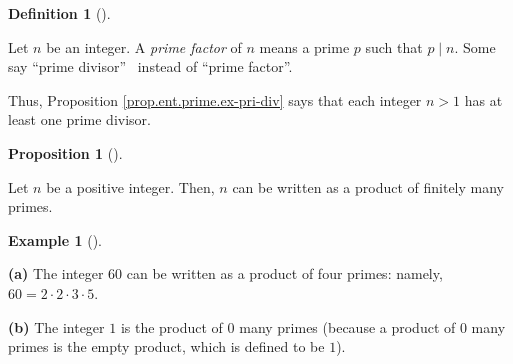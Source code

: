 \documentclass[numbers=enddot,12pt,final,onecolumn,notitlepage]{scrartcl}%
\numberwithin{exer}{subsection}
\theoremstyle{definition}
\newtheorem{prop}[theo]{Proposition}
\newenvironment{proposition}[1][]
{\begin{prop}[#1]\begin{leftbar}}
{\end{leftbar}\end{prop}}
\newtheorem{defi}[theo]{Definition}
\newenvironment{definition}[1][]
{\begin{defi}[#1]\begin{leftbar}}
{\end{leftbar}\end{defi}}
\newtheorem{exam}[theo]{Example}
\newenvironment{example}[1][]
{\begin{exam}[#1]\begin{leftbar}}
{\end{leftbar}\end{exam}}
\begin{document}
\begin{definition}
Let $n$ be an integer. A \textit{prime factor} of $n$ means a prime $p$ such
that $p\mid n$. Some say \textquotedblleft prime divisor\textquotedblright%
\ instead of \textquotedblleft prime factor\textquotedblright.
\end{definition}

Thus, Proposition \ref{prop.ent.prime.ex-pri-div} says that each integer $n>1$
has at least one prime divisor.

\begin{proposition}
\label{prop.ent.prime.fac-ex}Let $n$ be a positive integer. Then, $n$ can be
written as a product of finitely many primes.
\end{proposition}

\begin{example}
\label{exa.ent.prime.fac-ex}\textbf{(a)} The integer $60$ can be written as a
product of four primes: namely, $60=2\cdot2\cdot3\cdot5$.

\textbf{(b)} The integer $1$ is the product of $0$ many primes (because a
product of $0$ many primes is the empty product, which is defined to be $1$).
\end{example}
\end{document}
